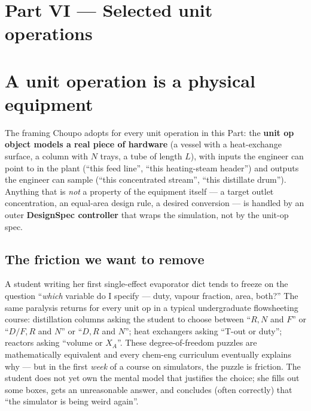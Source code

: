 \documentclass[11pt,a4paper]{article}
\begin{document}
\clearpage
\section*{Part VI --- Selected unit operations}
{}

\setcounter{section}{0}

\section{A unit operation is a physical equipment}\label{ch:op-is-equipment}

\begin{whatyoulllearn}
The framing Choupo adopts for every unit operation in this Part: the
\textbf{unit op object models a real piece of hardware} (a vessel
with a heat-exchange surface, a column with $N$ trays, a tube of
length $L$), with inputs the engineer can point to in the plant
(``this feed line'', ``this heating-steam header'') and outputs the
engineer can sample (``this concentrated stream'', ``this distillate
drum'').  Anything that is \emph{not} a property of the equipment
itself --- a target outlet concentration, an equal-area design
rule, a desired conversion --- is handled by an outer
\textbf{DesignSpec controller} that wraps the simulation, not by
the unit-op spec.
\end{whatyoulllearn}

\subsection{The friction we want to remove}

A student writing her first single-effect evaporator dict tends to
freeze on the question ``\emph{which} variable do I specify ---
duty, vapour fraction, area, both?''  The same paralysis returns
for every unit op in a typical undergraduate flowsheeting course:
distillation columns asking the student to choose between
``$R, N$ and $F$'' or ``$D/F, R$ and $N$'' or ``$D, R$ and $N$'';
heat exchangers asking ``T-out or duty''; reactors asking
``volume or $X_A$''.  These degree-of-freedom puzzles are
mathematically equivalent and every chem-eng curriculum eventually
explains why --- but in the first \emph{week} of a course on
simulators, the puzzle is friction.  The student does not yet
own the mental model that justifies the choice; she fills out
some boxes, gets an unreasonable answer, and concludes (often
correctly) that ``the simulator is being weird again''.
\end{document}
